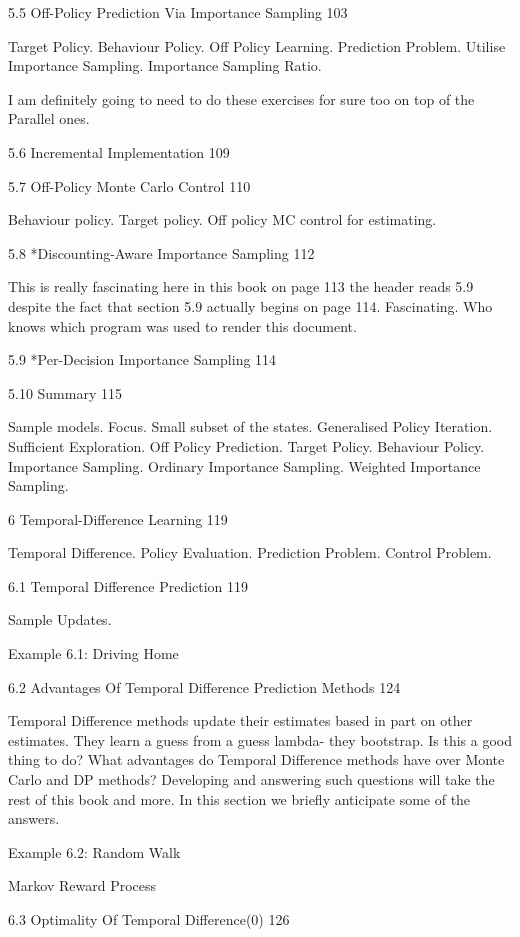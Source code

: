 5.5 Off-Policy Prediction Via Importance Sampling 103

Target Policy. Behaviour Policy. Off Policy Learning. Prediction Problem. Utilise Importance Sampling. Importance Sampling Ratio.

I am definitely going to need to do these exercises for sure too on top of the Parallel ones.

5.6 Incremental Implementation 109



5.7 Off-Policy Monte Carlo Control 110

Behaviour policy. Target policy. Off policy MC control for estimating.

5.8 *Discounting-Aware Importance Sampling 112

This is really fascinating here in this book on page 113 the header reads 5.9 despite the fact that section 5.9 actually begins on page 114. Fascinating. Who knows which program was used to render this document.

5.9 *Per-Decision Importance Sampling 114



5.10 Summary 115

Sample models. Focus. Small subset of the states. Generalised Policy Iteration. Sufficient Exploration. Off Policy Prediction. Target Policy. Behaviour Policy. Importance Sampling. Ordinary Importance Sampling. Weighted Importance Sampling.

6 Temporal-Difference Learning 119

Temporal Difference. Policy Evaluation. Prediction Problem. Control Problem.

6.1 Temporal Difference Prediction 119

Sample Updates.

Example 6.1: Driving Home

6.2 Advantages Of Temporal Difference Prediction Methods 124

Temporal Difference methods update their estimates based in part on other estimates. They learn a guess from a guess lambda- they bootstrap. Is this a good thing to do? What advantages do Temporal Difference methods have over Monte Carlo and DP methods? Developing and answering such questions will take the rest of this book and more. In this section we briefly anticipate some of the answers.

Example 6.2: Random Walk

Markov Reward Process

6.3 Optimality Of Temporal Difference(0) 126

